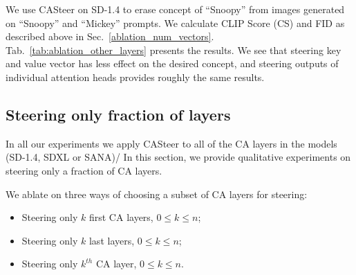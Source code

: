 We use CASteer on SD-1.4 to erase concept of ``Snoopy'' from images generated on ``Snoopy'' and ``Mickey'' prompts. We calculate CLIP Score (CS) and FID as described above in Sec.~\ref{ablation_num_vectors}. Tab.~\ref{tab:ablation_other_layers} presents the results. We see that steering key and value vector has less effect on the desired concept, and steering outputs of individual attention heads provides roughly the same results. 

\begin{table}[h!]
\caption{\textbf{Quantitative evaluation of steering other layers}.}
\label{tab:ablation_other_layers}
\centering
\setlength{\tabcolsep}{2.0pt}
\end{table}



\subsection{Steering only fraction of layers}
\label{sec:steering_fraction}

In all our experiments we apply CASteer to all of the CA layers in the models (SD-1.4, SDXL or SANA)/ In this section, we provide qualitative experiments on steering only a fraction of CA layers. 

We ablate on three ways of choosing a subset of CA layers for steering: 
\begin{itemize}
\item Steering only $k$ first CA layers, $0 \leqslant k \leqslant n$;
\item Steering only $k$ last layers, $0 \leqslant k \leqslant n$; 
\item Steering only $k^{th}$ CA layer, $0 \leqslant k \leqslant n$.
\end{itemize}

